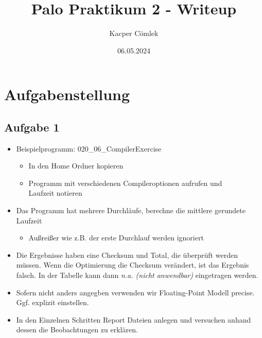 \documentclass{article}
\author{Kacper Cömlek}
\title{Palo Praktikum 2 - Writeup}
\date{06.05.2024}
\begin{document}
\maketitle
\tableofcontents 


\section{Aufgabenstellung}

\subsection{Aufgabe 1}
  
\begin{itemize}
	  
	\item Beispielprogramm: 020\_06\_CompilerExercise
	        
	      \begin{itemize}
	      	\item In den Home Ordner kopieren
	      	\item Programm mit verschiedenen Compileroptionen aufrufen und \\Laufzeit notieren
	      \end{itemize}
	      
	\item Das Programm hat mehrere Durchläufe, berechne die mittlere gerundete Laufzeit
	        
	      \begin{itemize}
	      	\item Außreißer wie z.B. der erste Durchlauf werden ignoriert
	      \end{itemize}
	      
	\item Die Ergebnisse haben eine Checksum und Total, die überprüft werden müssen. 
	      Wenn die Optimierung die Checksum verändert, ist das Ergebnis falsch. 
	      In der Tabelle kann dann \emph{n.a. (nicht anwendbar)} eingetragen werden.
	      
	\item Sofern nicht anders angegben verwenden wir Floating-Point Modell precise. 
	      Ggf. explizit einstellen. 
	        
	\item In den Einzelnen Schritten Report Dateien anlegen und versuchen anhand 
	      dessen die Beobachtungen zu erklären. 
\end{itemize}
\end{document}
